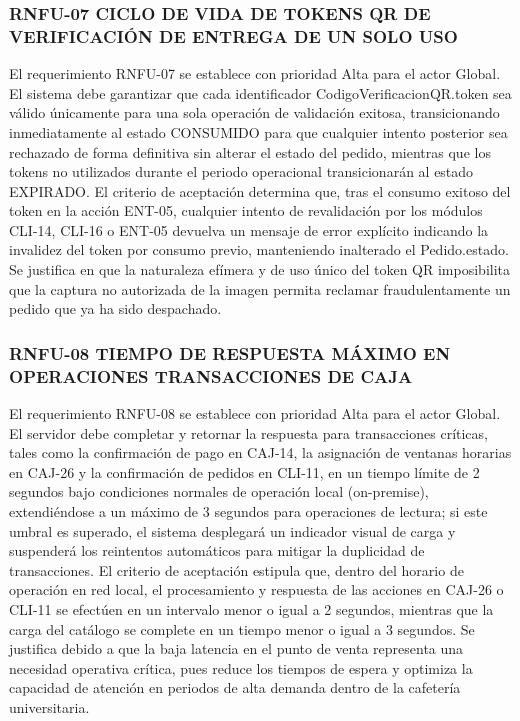 \subsubsection{RNFU-07 CICLO DE VIDA DE TOKENS QR DE VERIFICACIÓN DE ENTREGA DE UN SOLO USO}
El requerimiento RNFU-07 se establece con prioridad Alta para el actor Global. El sistema debe garantizar que cada identificador CodigoVerificacionQR.token sea válido únicamente para una sola operación de validación exitosa, transicionando inmediatamente al estado CONSUMIDO para que cualquier intento posterior sea rechazado de forma definitiva sin alterar el estado del pedido, mientras que los tokens no utilizados durante el periodo operacional transicionarán al estado EXPIRADO. El criterio de aceptación determina que, tras el consumo exitoso del token en la acción ENT-05, cualquier intento de revalidación por los módulos CLI-14, CLI-16 o ENT-05 devuelva un mensaje de error explícito indicando la invalidez del token por consumo previo, manteniendo inalterado el Pedido.estado. Se justifica en que la naturaleza efímera y de uso único del token QR imposibilita que la captura no autorizada de la imagen permita reclamar fraudulentamente un pedido que ya ha sido despachado.

\subsubsection{RNFU-08 TIEMPO DE RESPUESTA MÁXIMO EN OPERACIONES TRANSACCIONES DE CAJA}
El requerimiento RNFU-08 se establece con prioridad Alta para el actor Global. El servidor debe completar y retornar la respuesta para transacciones críticas, tales como la confirmación de pago en CAJ-14, la asignación de ventanas horarias en CAJ-26 y la confirmación de pedidos en CLI-11, en un tiempo límite de 2 segundos bajo condiciones normales de operación local (on-premise), extendiéndose a un máximo de 3 segundos para operaciones de lectura; si este umbral es superado, el sistema desplegará un indicador visual de carga y suspenderá los reintentos automáticos para mitigar la duplicidad de transacciones. El criterio de aceptación estipula que, dentro del horario de operación en red local, el procesamiento y respuesta de las acciones en CAJ-26 o CLI-11 se efectúen en un intervalo menor o igual a 2 segundos, mientras que la carga del catálogo se complete en un tiempo menor o igual a 3 segundos. Se justifica debido a que la baja latencia en el punto de venta representa una necesidad operativa crítica, pues reduce los tiempos de espera y optimiza la capacidad de atención en periodos de alta demanda dentro de la cafetería universitaria.

